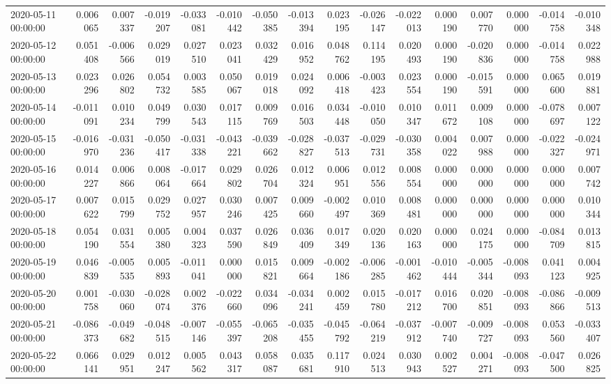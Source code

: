\begin{tabular}{lrrrrrrrrrrrrrrr}
2020-05-11 00:00:00 & 0.006065 & 0.007337 & -0.019207 & -0.033081 & -0.010442 & -0.050385 & -0.013394 & 0.023195 & -0.026147 & -0.022013 & 0.000190 & 0.007770 & 0.000000 & -0.014758 & -0.010348 \\
2020-05-12 00:00:00 & 0.051408 & -0.006566 & 0.029019 & 0.027510 & 0.023041 & 0.032429 & 0.016952 & 0.048762 & 0.114195 & 0.020493 & 0.000190 & -0.020836 & 0.000000 & -0.014758 & 0.022988 \\
2020-05-13 00:00:00 & 0.023296 & 0.026802 & 0.054732 & 0.003585 & 0.050067 & 0.019018 & 0.024092 & 0.006418 & -0.003423 & 0.023554 & 0.000190 & -0.015591 & 0.000000 & 0.065600 & 0.019881 \\
2020-05-14 00:00:00 & -0.011091 & 0.010234 & 0.049799 & 0.030543 & 0.017115 & 0.009769 & 0.016503 & 0.034448 & -0.010050 & 0.010347 & 0.011672 & 0.009108 & 0.000000 & -0.078697 & 0.007122 \\
2020-05-15 00:00:00 & -0.016970 & -0.031236 & -0.050417 & -0.031338 & -0.043221 & -0.039662 & -0.028827 & -0.037513 & -0.029731 & -0.030358 & 0.004022 & 0.007988 & 0.000000 & -0.022327 & -0.024971 \\
2020-05-16 00:00:00 & 0.014227 & 0.006866 & 0.008064 & -0.017664 & 0.029802 & 0.026704 & 0.012324 & 0.006951 & 0.012556 & 0.008554 & 0.000000 & 0.000000 & 0.000000 & 0.000000 & 0.007742 \\
2020-05-17 00:00:00 & 0.007622 & 0.015799 & 0.029752 & 0.027957 & 0.030246 & 0.007425 & 0.009660 & -0.002497 & 0.010369 & 0.008481 & 0.000000 & 0.000000 & 0.000000 & 0.000000 & 0.010344 \\
2020-05-18 00:00:00 & 0.054190 & 0.031554 & 0.005380 & 0.004323 & 0.037590 & 0.026849 & 0.036409 & 0.017349 & 0.020136 & 0.020163 & 0.000000 & 0.024175 & 0.000000 & -0.084709 & 0.013815 \\
2020-05-19 00:00:00 & 0.046839 & -0.005535 & 0.005893 & -0.011041 & 0.000000 & 0.015821 & 0.009664 & -0.002186 & -0.006285 & -0.001462 & -0.010444 & -0.005344 & -0.008093 & 0.041123 & 0.004925 \\
2020-05-20 00:00:00 & 0.001758 & -0.030060 & -0.028074 & 0.002376 & -0.022660 & 0.034096 & -0.034241 & 0.002459 & 0.015780 & -0.017212 & 0.016700 & 0.020851 & -0.008093 & -0.086866 & -0.009513 \\
2020-05-21 00:00:00 & -0.086373 & -0.049682 & -0.048515 & -0.007146 & -0.055397 & -0.065208 & -0.035455 & -0.045792 & -0.064219 & -0.037912 & -0.007740 & -0.009727 & -0.008093 & 0.053560 & -0.033407 \\
2020-05-22 00:00:00 & 0.066141 & 0.029951 & 0.012247 & 0.005562 & 0.043317 & 0.058087 & 0.035681 & 0.117910 & 0.024513 & 0.030943 & 0.002527 & 0.004271 & -0.008093 & -0.047500 & 0.026825 \\

\end{tabular}
